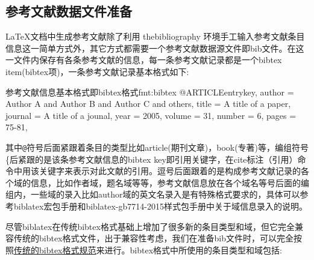 \documentclass[twoside]{article} %
\begin{document}
\subsection{参考文献数据文件准备}
\LaTeX 文档中生成参考文献除了利用 thebibliography 环境手工输入参考文献条目信息这一简单方式外，其它方式都需要一个参考文献数据源文件即bib文件。在这一文件内保存有各条参考文献的信息，每一条参考文献记录都是一个bibtex item(bibtex项)，一条参考文献记录基本格式如下:
\begin{codetex}{参考文献信息基本格式即bibtex格式}{fmt:bibtex}
@ARTICLE{entrykey,
  author =       {Author A and Author B and Author C and others},
  title =        {A title of a paper},
  journal =      {A title of a jounal},
  year =         {2005},
  volume =       {31},
  number =       {6},
  pages =        {75-81},
}
\end{codetex}

其中\verb|@|符号后面紧跟着条目的类型比如article(期刊文章)，book(专著)等，编组符号\{后紧跟的是该条参考文献信息的bibtex key即引用关键字，在cite标注（引用）命令中用该关键字来表示对此文献的引用。逗号后面跟着的是构成参考文献记录的各个域的信息，比如作者域，题名域等等，参考文献信息放在各个域名等号后面的编组内，一些域的录入比如author域的英文名录入是有特殊格式要求的，具体可以参考biblatex宏包手册和biblatex-gb7714-2015样式包手册\cite{胡振震2016}中关于域信息录入的说明。

尽管biblatex在传统bibtex格式基础上增加了很多新的条目类型和域，但它完全兼容传统的bibtex格式文件，出于兼容性考虑，我们在准备bib文件时，可以完全按照\href{https://en.wikipedia.org/wiki/BibTeX}{传统的bibtex格式规范}来进行。bibtex格式中所使用的条目类型和域包括:
\end{document}
